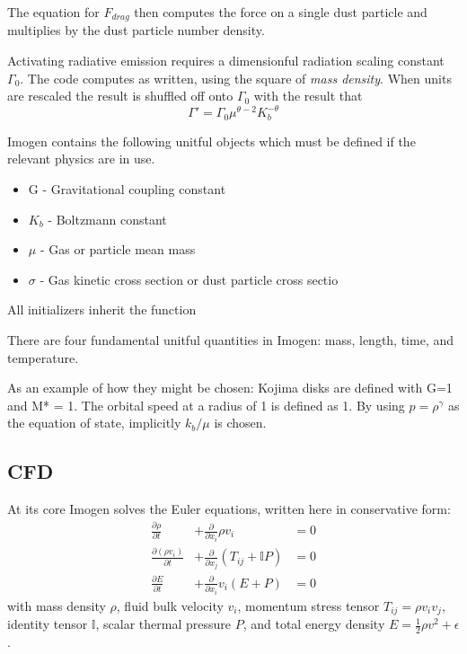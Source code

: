 \documentclass[letterpaper,12pt]{article}
\begin{document}
The equation for $F_{drag}$ then computes the force on a single dust particle and multiplies by the dust particle
number density.

Activating radiative emission requires a dimensionful radiation scaling constant $\Gamma_0$.
The code computes as written, using the square of \textit{mass density}. When units are rescaled
the result is shuffled off onto $\Gamma_0$ with the result that
\begin{equation}
\Gamma' = \Gamma_0 \mu^{\theta-2} K_b^{-\theta}
\end{equation}

Imogen contains the following unitful objects which must be defined if the relevant
physics are in use.
\begin{itemize}
\item G - Gravitational coupling constant
\item $K_b$ - Boltzmann constant
\item $\mu$ - Gas or particle mean mass
\item $\sigma$ - Gas kinetic cross section or dust particle cross sectio
\end{itemize}
All initializers inherit the function 

There are four fundamental unitful quantities in Imogen: mass, length, time, and temperature.

As an example of how they might be chosen: Kojima disks are defined with G=1 and M* = 1. The
orbital speed at a radius of 1 is defined as 1. By using $p = \rho^\gamma$ as the equation
of state, implicitly $k_b/\mu$ is chosen.



\subsection{CFD}

At its core Imogen solves the Euler equations, written here in conservative form:
\begin{align*}
\frac{\partial \rho}{\partial t} &+ \frac{\partial}{\partial x_i} \rho v_i &= 0 \\
\frac{\partial (\rho v_i)}{\partial t} &+ \frac{\partial}{\partial x_j} (T_{ij} + \mathbb{I} P) &= 0 \\
\frac{\partial E}{\partial t} &+ \frac{\partial}{\partial x_i} v_i (E + P) &= 0
\end{align*}
with mass density $\rho$, fluid bulk velocity $v_i$, momentum stress tensor
$T_{ij} = \rho v_i v_j$, identity tensor $\mathbb{I}$, scalar thermal pressure $P$,
and total energy density $E = \frac{1}{2} \rho v^2 + \epsilon$.
\end{document}
